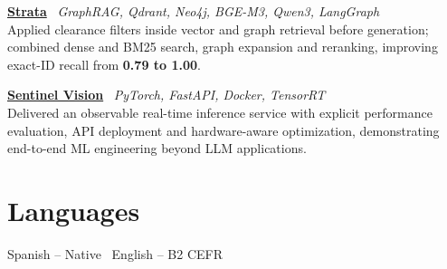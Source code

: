 \documentclass[10pt,a4paper]{article}
\newcommand{\project}[3]{
  \textbf{#1} \textbar\ {\small\color{muted}\textit{#2}}\\[-1.5pt]
  #3\par\vspace{2pt}
}
\begin{document}
\project{\href{https://lucasfiz.dev/en/projects/strata}{Strata}}{GraphRAG, Qdrant, Neo4j, BGE-M3, Qwen3, LangGraph}{Applied clearance filters inside vector and graph retrieval before generation; combined dense and BM25 search, graph expansion and reranking, improving exact-ID recall from \textbf{0.79 to 1.00}.}

\project{\href{https://lucasfiz.dev/en/projects/sentinel-vision}{Sentinel Vision}}{PyTorch, FastAPI, Docker, TensorRT}{Delivered an observable real-time inference service with explicit performance evaluation, API deployment and hardware-aware optimization, demonstrating end-to-end ML engineering beyond LLM applications.}

\section{Languages}
Spanish -- Native \textbar\ English -- B2 CEFR
\end{document}
